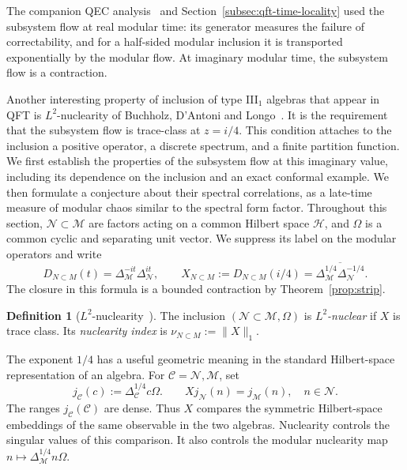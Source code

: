 \documentclass[a4paper,11pt]{article}
\theoremstyle{definition}
\newtheorem{definition}{Definition}[section]
\begin{document}
The companion QEC analysis~\cite{companionQEC} and Section~\ref{subsec:qft-time-locality} used the subsystem flow at real modular time: its generator measures the failure of correctability, and for a half-sided modular inclusion it is transported exponentially by the modular flow. At imaginary modular time, the subsystem flow is a contraction. 

Another interesting property of inclusion of type III$_1$ algebras that appear in QFT is $L^2$-nuclearity of Buchholz, D'Antoni and Longo~\cite{BDL2007}. It is the requirement that the subsystem flow is trace-class at $z=i/4$. This condition attaches to the inclusion a positive operator, a discrete spectrum, and a finite partition function. We first establish the properties of the subsystem flow at this imaginary value, including its dependence on the inclusion and an exact conformal example. We then formulate a conjecture about their spectral correlations, as a late-time measure of modular chaos similar to the spectral form factor. Throughout this section, $\mathcal N\subset\mathcal M$ are factors acting on a common Hilbert space $\mathcal H$, and $\Omega$ is a common cyclic and separating unit vector. We suppress its label on the modular operators and write
\begin{equation}
 D_{N\subset M}(t)=\Delta_{\mathcal M}^{-it}\Delta_{\mathcal N}^{it},
 \qquad
 X_{N\subset M}:=D_{N\subset M}(i/4)
 =\overline{\Delta_{\mathcal M}^{1/4}\Delta_{\mathcal N}^{-1/4}}.
 \label{eq:inclusion-X}
\end{equation}
The closure in this formula is a bounded contraction by Theorem~\ref{prop:strip}.

\begin{definition}[$L^2$-nuclearity~\cite{BDL2007}]\label{def:L2-nuclear}
The inclusion $(\mathcal N\subset\mathcal M,\Omega)$ is \emph{$L^2$-nuclear} if $X$ is trace class. Its \emph{nuclearity index} is $\nu_{N\subset M}:=\|X\|_1$.
\end{definition}

The exponent $1/4$ has a useful geometric meaning in the standard Hilbert-space representation of an algebra. For $\mathcal C=\mathcal N,\mathcal M$, set
\begin{equation}
 j_{\mathcal C}(c):=\Delta_{\mathcal C}^{1/4}c\Omega.
 \qquad
 Xj_{\mathcal N}(n)=j_{\mathcal M}(n),\quad n\in\mathcal N.
 \label{eq:inclusion-symmetric-embedding}
\end{equation}
The ranges $j_{\mathcal C}(\mathcal C)$ are dense. Thus $X$ compares the symmetric Hilbert-space embeddings of the same observable in the two algebras. Nuclearity controls the singular values of this comparison. It also controls the modular nuclearity map $n\mapsto\Delta_{\mathcal M}^{1/4}n\Omega$.
\end{document}
